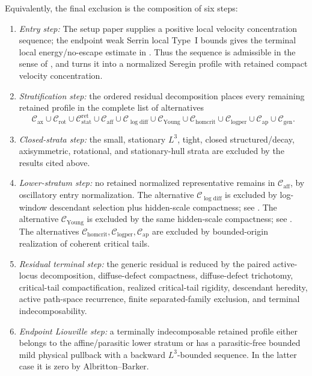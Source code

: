 \documentclass[11pt]{amsart}
\numberwithin{equation}{section}
\theoremstyle{plain}
\theoremstyle{definition}
\theoremstyle{remark}
\newcommand{\Cax}{\mathcal C_{\mathrm{ax}}}
\newcommand{\Crot}{\mathcal C_{\mathrm{rot}}}
\newcommand{\Cstat}{\mathcal C_{\mathrm{stat}}^{\mathrm{ret}}}
\newcommand{\Caff}{\mathcal C_{\mathrm{aff}}}
\newcommand{\Cgen}{\mathcal C_{\mathrm{gen}}}
\newcommand{\Chomcrit}{\mathcal C_{\mathrm{homcrit}}}
\newcommand{\Clogper}{\mathcal C_{\mathrm{logper}}}
\newcommand{\Capcrit}{\mathcal C_{\mathrm{ap}}}
\newcommand{\Cyoung}{\mathcal C_{\mathrm{Young}}}
\newcommand{\Clogdiff}{\mathcal C_{\log\mathrm{diff}}}
\begin{document}
Equivalently, the final exclusion is the composition of six steps:
\begin{enumerate}[label=\textup{(\arabic*)}]
   \item \emph{Entry step:} The setup paper supplies a positive local
   velocity concentration sequence; the endpoint weak Serrin local Type~I bounds
    gives the terminal local
   energy/no-escape estimate in
   .  Thus the sequence is
   admissible in the sense of , and
    turns it into a normalized Seregin profile
   with retained compact velocity concentration.
   \item \emph{Stratification step:} the ordered residual decomposition
   places every remaining retained profile in the complete list of alternatives
   \[
      \Cax\cup\Crot\cup\Cstat\cup\Caff
      \cup\Clogdiff\cup\Cyoung\cup\Chomcrit\cup\Clogper\cup\Capcrit
      \cup\Cgen .
   \]
   \item \emph{Closed-strata step:} the small, stationary \(L^3\),
   tight, closed structured/decay, axisymmetric, rotational, and
   stationary-hull strata are excluded by the results cited above.
   \item \emph{Lower-stratum step:} no retained normalized representative remains
   in \(\Caff\), by oscillatory entry normalization.  The alternative
   \(\Clogdiff\) is excluded by
   log-window descendant selection plus hidden-scale compactness; see
   .  The alternative \(\Cyoung\) is
   excluded by the same hidden-scale compactness; see
   .  The alternatives
   \(\Chomcrit,\Clogper,\Capcrit\) are excluded by bounded-origin
   realization of coherent critical tails.
   \item \emph{Residual terminal step:} the generic residual is reduced
   by the paired active-locus decomposition, diffuse-defect compactness,
   diffuse-defect trichotomy, critical-tail compactification, realized
   critical-tail rigidity, descendant heredity, active path-space recurrence, finite
   separated-family exclusion, and terminal indecomposability.
   \item \emph{Endpoint Liouville step:} a terminally indecomposable
   retained profile either belongs to the affine/parasitic lower stratum
   or has a parasitic-free bounded mild physical pullback with a backward
   \(L^3\)-bounded sequence.  In the latter case it is zero by
   Albritton--Barker.
\end{enumerate}
\end{document}
